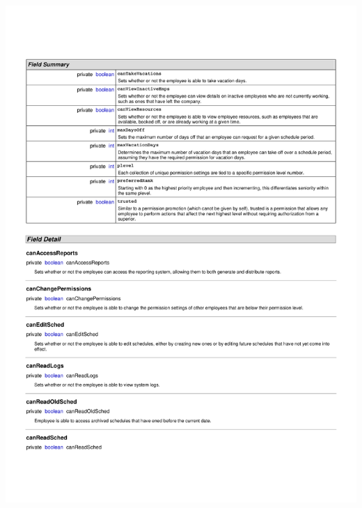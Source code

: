 \documentclass[letterpaper,12pt]{report}
\begin{document}
\includegraphics[scale=0.9,trim=20mm 30mm 25mm 25mm]{externals/ProblemDomainDataDictionary8.pdf}
\newpage
\end{document}
